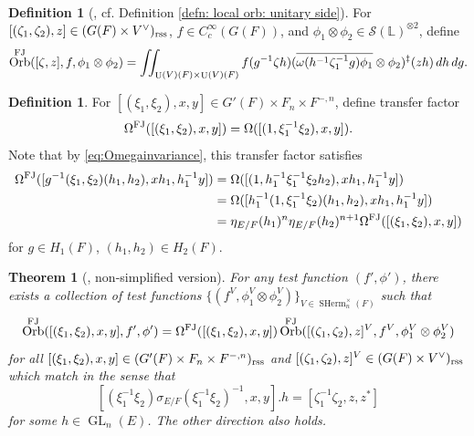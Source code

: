 \documentclass[11pt, reqno]{amsart}
\numberwithin{equation}{subsection}
\theoremstyle{plain}
\newtheorem{theorem}[proposition]{Theorem}
\theoremstyle{definition}
\newtheorem{definition}[proposition]{Definition}
\newcommand{\LL}{\mathbb L}
\newcommand{\ol}{\overline}
\newcommand{\cS}{\mathcal S}
\DeclareMathOperator{\GL}{GL}
\DeclareMathOperator{\Orb}{Orb}
\DeclareMathOperator{\SHerm}{SHerm}
\DeclareMathOperator{\U}{U}
\newcommand{\FJ}{\textnormal{FJ}}
\newcommand{\rss}{\textnormal{rss}}
\begin{document}
\begin{definition}[{\cite[(4.1.2)]{Xue-GGP}}, cf.
Definition \ref{defn: local orb: unitary side}]
For $[(\zeta_1, \zeta_2), z] 
\in (G(F) \times V^\vee)_\rss$,
$f \in C_c^\infty(G(F))$, and $\phi_1 \otimes
\phi_2 \in \cS(\LL)^{\otimes 2}$, define
\begin{align*}
    \Orb^{\FJ}([\zeta, z], f, \phi_1 \otimes
    \phi_2) =
    \iint_{\U(V)(F) \times \U(V)(F)}
    f(g^{-1}\zeta h)
    (\ol{\omega(h^{-1}
    \zeta_1^{-1} g)\phi_1} \otimes \phi_2)^\ddagger(zh)\,dh\,dg.
\end{align*}
\end{definition}

\begin{definition}
For $[(\xi_1, \xi_2), x, y] \in G'(F) \times
F_n \times F^{-,n}$, define transfer factor
\[
    \Omega^{\FJ}([(\xi_1, \xi_2), x, y])
    = \Omega([(1, \xi_1^{-1}\xi_2), x, y]).
\]
Note that by \eqref{eq:Omegainvariance}, this
transfer factor satisfies
\begin{align*}
    \Omega^{\FJ}([g^{-1}(\xi_1, \xi_2)(h_1, h_2),
    xh_1, h_1^{-1}y])
    &= \Omega([(1, h_1^{-1}\xi_1^{-1}\xi_2 h_2),
    xh_1, h_1^{-1} y]) \\
    &= \Omega([h_1^{-1}(1, \xi_1^{-1}\xi_2)
    (h_1, h_2), xh_1, h_1^{-1}y]) \\
    &= \eta_{E/F}(h_1)^n\eta_{E/F}(h_2)^{n+1}
    \Omega^{\FJ}([(\xi_1, \xi_2), x, y])
\end{align*}
for $g \in H_1(F)$, $(h_1, h_2) \in H_2(F)$.
\end{definition}

\begin{theorem}[{\cite[Proposition 5.2.1]{Xue-GGP}},
non-simplified version]

\label{thm:FJtransfer}
For any test function $(f', \phi')$,
there exists a collection of test functions
$\{(f^V, \phi_1^V \otimes \phi_2^V)\}_{V \in \SHerm_n^\times(F)}$ such that
\[
    \Orb^{\FJ}([(\xi_1, \xi_2), x, y], f', \phi')
    = 
    \Omega^{\FJ}([(\xi_1, \xi_2), x, y])
    \Orb^{\FJ}([(\zeta_1, \zeta_2), z]^V, f^V, 
    \phi_1^V \otimes \phi_2^V)
\]
for all $[(\xi_1, \xi_2), x, y] \in 
(G'(F) \times F_n \times F^{-,n})_\rss$
and $[(\zeta_1, \zeta_2), z]^V 
\in (G(F) \times V^\vee)_\rss$ which match 
in the sense that
\[
    [(\xi_1^{-1}\xi_2)\sigma_{E/F}(\xi_1^{-1}\xi_2)^{-1},
x, y].h = [\zeta_1^{-1}\zeta_2, z, z^\ast]
\]
for some $h \in \GL_n(E)$.
The other direction also holds.
\end{theorem}
\end{document}
